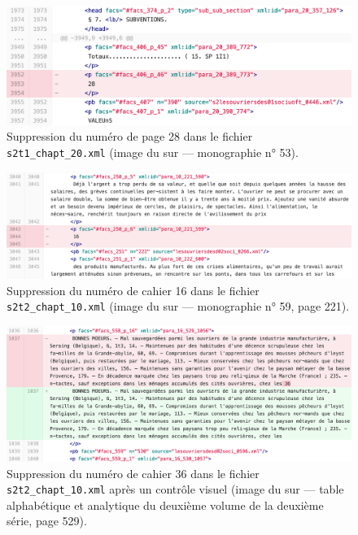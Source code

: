 \begin{figure}
    \centering
    \includegraphics[width=15cm]{img/suppr_num_page.png}
    \caption{Suppression du numéro de page 28 dans le fichier  \texttt{s2t1\_chapt\_20.xml} (image du \commit{} sur \gitlab{} --- monographie n° 53).}
    \label{fig:supprnumpage}
\end{figure}

\begin{figure}
    \centering
    \includegraphics[width=16cm]{img/suppr_num _cahier.png}
    \caption{Suppression du numéro de cahier 16 dans le fichier  \texttt{s2t2\_chapt\_10.xml} (image du \commit{} sur \gitlab{} --- monographie n° 59, page 221).}
    \label{fig:suppnumcahier}
\end{figure}

\begin{figure}
    \centering
    \includegraphics[width=16cm]{img/suppr_num _cahier_visuel.png}
    \caption{Suppression du numéro de cahier 36 dans le fichier  \texttt{s2t2\_chapt\_10.xml} après un contrôle visuel (image du \commit{} sur \gitlab{} --- table alphabétique et analytique du deuxième volume de la deuxième série, page 529).}
    \label{fig:suppnumcahiervisu}
\end{figure}


